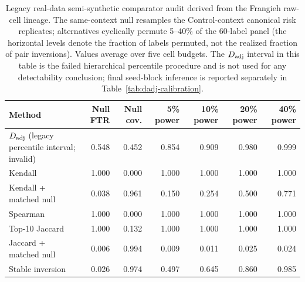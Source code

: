 \begin{table}[t]
\centering
\small
\setlength{\tabcolsep}{3pt}
\caption{Legacy real-data semi-synthetic comparator audit derived from the
Frangieh raw-cell lineage. The same-context null resamples the Control-context
canonical risk replicates; alternatives cyclically permute 5--40\% of the
60-label panel (the horizontal levels denote the fraction of labels permuted,
not the realized fraction of pair inversions). Values average over five cell
budgets. The $D_{\rm adj}$ interval in this table is the failed hierarchical
percentile procedure and is not used for any detectability conclusion; final
seed-block inference is reported separately in Table~\ref{tab:dadj-calibration}.}
\label{tab:v3-realdata-semisynthetic}
\begin{tabular}{lrrrrrr}
\toprule
Method & Null FTR & Null cov. & 5\% power & 10\% power & 20\% power & 40\% power \\
\midrule
$D_{\rm adj}$ (legacy percentile interval; invalid) & 0.548 & 0.452 & 0.854 & 0.909 & 0.980 & 0.999 \\
Kendall & 1.000 & 0.000 & 1.000 & 1.000 & 1.000 & 1.000 \\
Kendall + matched null & 0.038 & 0.961 & 0.150 & 0.254 & 0.500 & 0.771 \\
Spearman & 1.000 & 0.000 & 1.000 & 1.000 & 1.000 & 1.000 \\
Top-10 Jaccard & 1.000 & 0.132 & 1.000 & 1.000 & 1.000 & 1.000 \\
Jaccard + matched null & 0.006 & 0.994 & 0.009 & 0.011 & 0.025 & 0.024 \\
Stable inversion & 0.026 & 0.974 & 0.497 & 0.645 & 0.860 & 0.985 \\
\bottomrule
\end{tabular}
\end{table}

